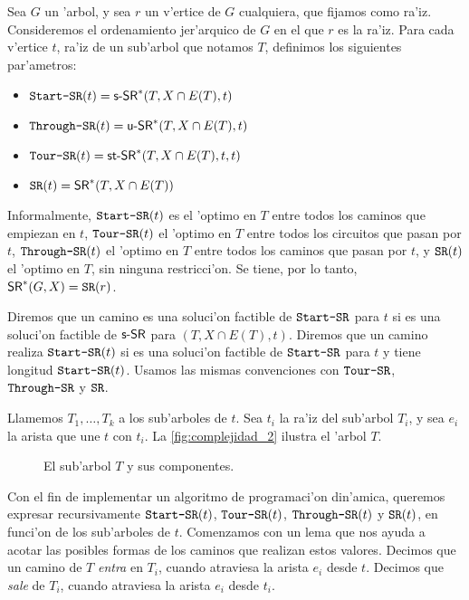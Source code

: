 
Sea $G$ un 'arbol, y sea $r$ un v'ertice de $G$ cualquiera, que fijamos como ra'iz. Consideremos el ordenamiento jer'arquico de $G$ en el que $r$ es la ra'iz. Para cada v'ertice $t$, ra'iz de un sub'arbol que notamos $T$, definimos los siguientes par'ametros:

\begin{itemize}
\item[]$\texttt{Start-SR}(t) = \textnormal{\textsf{s-SR}}^*(T, X \cap E(T), t)$
\item[]$\texttt{Through-SR}(t) = \textnormal{\textsf{u-SR}}^*(T, X \cap E(T), t)$
\item[]$\texttt{Tour-SR}(t) = \textnormal{\textsf{st-SR}}^*(T, X \cap E(T), t, t)$
\item[]$\texttt{SR}(t) = \textnormal{\textsf{SR}}^*(T, X \cap E(T))$
\end{itemize}

\noindent
Informalmente, $\texttt{Start-SR}(t)$ es el 'optimo en $T$ entre todos los caminos que empiezan en $t$, $\texttt{Tour-SR}(t)$ el 'optimo en $T$ entre todos los circuitos que pasan por $t$, $\texttt{Through-SR}(t)$ el 'optimo en $T$ entre todos los caminos que pasan por $t$, y $\texttt{SR}(t)$ el 'optimo en $T$, sin ninguna restricci'on. Se tiene, por lo tanto, $\textnormal{\textsf{SR}}^*(G, X) = \texttt{SR}(r)$.

Diremos que un camino es una soluci'on factible de $\texttt{Start-SR}$ para $t$ si es una soluci'on factible de $\textnormal{\textsf{s-SR}}$ para $(T, X \cap E(T), t)$. Diremos que un camino realiza $\texttt{Start-SR}(t)$ si es una soluci'on factible de $\texttt{Start-SR}$ para $t$ y tiene longitud $\texttt{Start-SR}(t)$. Usamos las mismas convenciones con $\texttt{Tour-SR}$, $\texttt{Through-SR}$ y $\texttt{SR}$.

Llamemos $T_1, \dots, T_k$ a los sub'arboles de $t$. Sea $t_i$ la ra'iz del sub'arbol $T_i$, y sea $e_i$ la arista que une $t$ con $t_i$. La \autoref{fig:complejidad_2} ilustra el 'arbol $T$.

\begin{figure}[h]
	\begin{center}
		
	\end{center}		
	\caption{El sub'arbol $T$ y sus componentes.}
	\label{fig:complejidad_2}
\end{figure}

Con el fin de implementar un algoritmo de programaci'on din'amica, queremos expresar recursivamente $\texttt{Start-SR}(t)$, $\texttt{Tour-SR}(t)$, $\texttt{Through-SR}(t)$ y $\texttt{SR}(t)$, en funci'on de los sub'arboles de $t$. Comenzamos con un lema que nos ayuda a acotar las posibles formas de los caminos que realizan estos valores. Decimos que un camino de $T$ \textit{entra} en $T_i$, cuando atraviesa la arista $e_i$ desde $t$. Decimos que \textit{sale} de $T_i$, cuando atraviesa la arista $e_i$ desde $t_i$.


